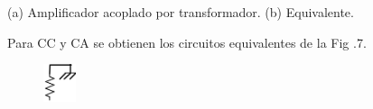 \documentclass[12pt]{article}
\begin{document}
\begin{adjustwidth}{0.0in}{0.01in}
\begin{Center}
(a) Amplificador acoplado por transformador. (b) Equivalente.
\end{Center}\par

\end{adjustwidth}


\vspace{\baselineskip}

\vspace{\baselineskip}
\begin{adjustwidth}{1.07in}{0.0in}
Para CC y CA se obtienen los circuitos equivalentes de la Fig .7.\par

\end{adjustwidth}




\begin{figure}[H]
\advance\leftskip 3.32in		\includegraphics[width=0.37in,height=0.44in]{./media/image13.png}
\end{figure}



\par


\vspace{\baselineskip}

\vspace{\baselineskip}


\end{document}

